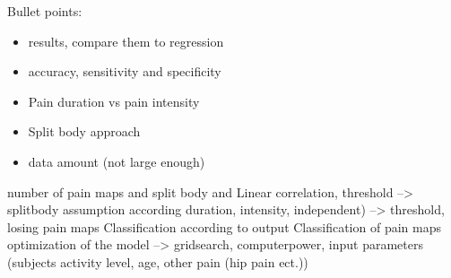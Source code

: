 Bullet points: 

\begin{itemize}
\item results, compare them to regression
\item accuracy, sensitivity and specificity
\item Pain duration vs pain intensity
\item Split body approach
\item data amount (not large enough)
\end{itemize}

number of pain maps and split body and Linear correlation, threshold
--> splitbody assumption according duration, intensity, independent)
--> threshold, losing pain maps 
Classification according to output
Classification of pain maps
optimization of the model --> gridsearch, computerpower, input parameters (subjects activity level, age, other pain (hip pain ect.))

